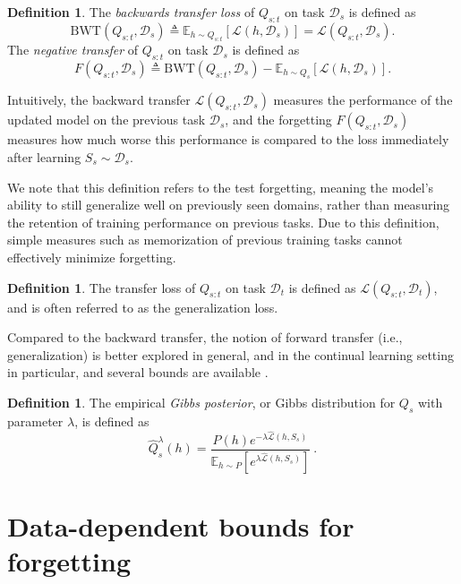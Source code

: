 \documentclass{article}
\theoremstyle{plain}
\theoremstyle{definition}
\newtheorem{definition}[theorem]{Definition}
\theoremstyle{remark}
\begin{document}
\begin{definition}
	The \emph{backwards transfer loss} of $Q_{s:t}$ on task $\mathcal{D}_s$ is defined as $$\mathrm{BWT}(Q_{s:t}, \mathcal{D}_s) \triangleq \mathbb{E}_{h\sim Q_{s:t}}\left [\mathcal{L}(h, \mathcal{D}_s)\right ]=\mathcal{L}(Q_{s:t}, \mathcal{D}_s).$$
	The \emph{negative transfer} of $Q_{s:t}$ on task $\mathcal{D}_s$ is defined as $$F(Q_{s:t}, \mathcal{D}_s) \triangleq \mathrm{BWT}(Q_{s:t}, \mathcal{D}_s) - \mathbb{E}_{h\sim Q_{s}}\left [\mathcal{L}(h, \mathcal{D}_s)\right ].$$
\end{definition}
Intuitively, the backward transfer $\mathcal{L}(Q_{s:t}, \mathcal{D}_s)$ measures the performance of the updated model on the previous task $\mathcal{D}_s$, and the forgetting $F(Q_{s:t}, \mathcal{D}_s)$ measures how much worse this performance is compared to the loss immediately after learning $S_s\sim\mathcal{D}_s$.

We note that this definition refers to the test forgetting, meaning the model's ability to still generalize well on previously seen domains, rather than measuring the retention of training performance on previous tasks. Due to this definition, simple measures such as memorization of previous training tasks cannot effectively minimize forgetting.
%
\begin{definition}
    The transfer loss of $Q_{s:t}$ on task $\mathcal{D}_t$ is defined as $\mathcal{L}(Q_{s:t}, \mathcal{D}_t)$, and is often referred to as the generalization loss.
\end{definition}

Compared to the backward transfer, the notion of forward transfer (i.e., generalization) is better explored in general, and in the continual learning setting in particular, and several bounds are available \cite{bennani2020generalisation, benavides2022theory}. 
\begin{definition}
    The empirical \emph{Gibbs posterior}, or Gibbs distribution for $Q_s$ with parameter $\lambda$, is defined as 
\begin{equation} \label{defn:gibbs}
\hat Q^\lambda_s(h)=\frac{P(h)e^{-\lambda\hat{\mathcal{L}}(h,S_s)}}{\mathbb{E}_{h\sim P}\left [e^{\lambda\hat{\mathcal{L}}(h,S_s)} \right ]}~ .
\end{equation}
\end{definition}

\section{Data-dependent bounds for forgetting}\label{sec:data-dep-bounds}
\end{document}
